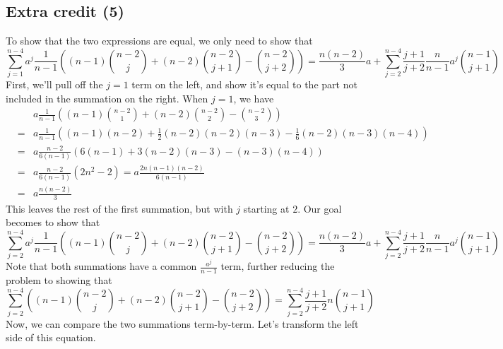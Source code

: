 \documentclass{article}
\begin{document}
\subsection{Extra credit (5)}
To show that the two expressions are equal, we only need to show that 
\[ \sum_{j=1}^{n-4} a^j \frac{1}{n-1}\left( (n-1)\binom{n-2}{j} + (n-2)\binom{n-2}{j+1} - \binom{n-2}{j+2} \right) =
\frac{n(n-2)}{3}a + \sum_{j=2}^{n-4}\frac{j+1}{j+2}\frac{n}{n-1}a^j \binom{n-1}{j+1} 
\]
First, we'll pull off the $j = 1$ term on the left, and show it's equal to the part not included in the summation on the right.
When $j=1$, we have
\begin{eqnarray*}
& & a\frac{1}{n-1}\left( (n-1)\binom{n-2}{1} + (n-2)\binom{n-2}{2} - \binom{n-2}{3} \right) \\
&=&  a\frac{1}{n-1}\left( (n-1)(n-2) + \frac{1}{2}(n-2)(n-2)(n-3) - \frac{1}{6}(n-2)(n-3)(n-4) \right) \\
&=&  a\frac{n-2}{6(n-1)}\left(6(n-1) + 3(n-2)(n-3) - (n-3)(n-4) \right) \\
&=&  a\frac{n-2}{6(n-1)}(2n^2 - 2) =  a\frac{2n(n-1)(n-2)}{6(n-1)} \\
&=&  a\frac{n(n-2)}{3}
\end{eqnarray*}
This leaves the rest of the first summation, but with $j$ starting at $2$. Our goal becomes to show that
\[
\sum_{j=2}^{n-4} a^j \frac{1}{n-1}\left( (n-1)\binom{n-2}{j} + (n-2)\binom{n-2}{j+1} - \binom{n-2}{j+2} \right) 
 = \frac{n(n-2)}{3}a + \sum_{j=2}^{n-4}\frac{j+1}{j+2}\frac{n}{n-1}a^j \binom{n-1}{j+1} 
\]
Note that both summations have a common $\frac{a^j}{n-1}$ term, further reducing the problem to showing that
\[
\sum_{j=2}^{n-4} \left( (n-1)\binom{n-2}{j} + (n-2)\binom{n-2}{j+1} - \binom{n-2}{j+2} \right) 
 = \sum_{j=2}^{n-4}\frac{j+1}{j+2}n \binom{n-1}{j+1} 
\]
Now, we can compare the two summations term-by-term. Let's transform the left side of this equation.
\end{document}
